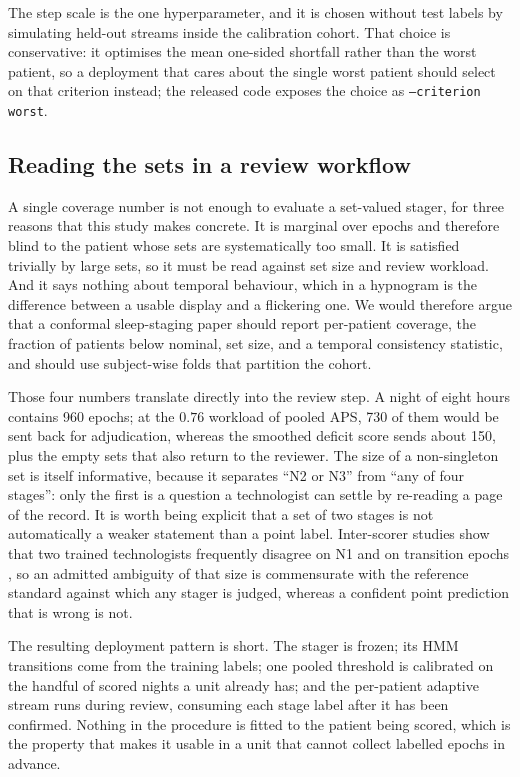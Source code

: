 The step scale is the one hyperparameter, and it is chosen without test
labels by simulating held-out streams inside the calibration cohort. That
choice is conservative: it optimises the mean one-sided shortfall rather than
the worst patient, so a deployment that cares about the single worst patient
should select on that criterion instead; the released code exposes the choice
as \texttt{--criterion worst}.

\subsection{Reading the sets in a review workflow}
\label{sec:disc-reading}

A single coverage number is not enough to evaluate a set-valued stager, for
three reasons that this study makes concrete. It is marginal over epochs and
therefore blind to the patient whose sets are systematically too small. It is
satisfied trivially by large sets, so it must be read against set size and
review workload. And it says nothing about temporal behaviour, which in a
hypnogram is the difference between a usable display and a flickering one. We
would therefore argue that a conformal sleep-staging paper should report
per-patient coverage, the fraction of patients below nominal, set size, and a
temporal consistency statistic, and should use subject-wise folds that
partition the cohort.

Those four numbers translate directly into the review step. A night of eight
hours contains 960 epochs; at the $0.76$ workload of pooled APS, 730 of them
would be sent back for adjudication, whereas the smoothed deficit score sends
about 150, plus the empty sets that also return to the reviewer. The size of a
non-singleton set is itself informative, because it separates ``N2 or N3''
from ``any of four stages'': only the first is a question a technologist can
settle by re-reading a page of the record. It is worth being explicit that a
set of two stages is not automatically a weaker statement than a point label.
Inter-scorer studies show that two trained technologists frequently disagree
on N1 and on transition epochs \citep{rosenberg2013}, so an admitted ambiguity
of that size is commensurate with the reference standard against which any
stager is judged, whereas a confident point prediction that is wrong is not.

The resulting deployment pattern is short. The stager is frozen; its HMM
transitions come from the training labels; one pooled threshold is calibrated
on the handful of scored nights a unit already has; and the per-patient
adaptive stream runs during review, consuming each stage label after it has
been confirmed. Nothing in the procedure is fitted to the patient being
scored, which is the property that makes it usable in a unit that cannot
collect labelled epochs in advance.


